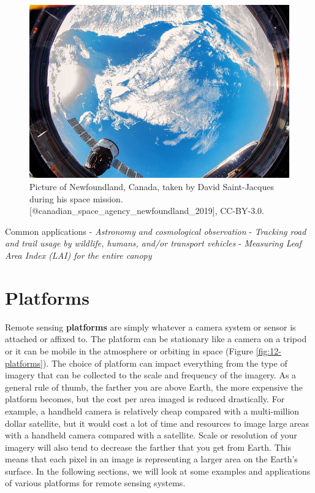 \documentclass[
]{book}
\begin{document}
\begin{figure}
\includegraphics[width=0.9\linewidth]{images/12-newfoundland_from_space} \caption{Picture of Newfoundland, Canada, taken by David Saint-Jacques during his space mission. [@canadian_space_agency_newfoundland_2019], CC-BY-3.0.}\label{fig:12-newfoundland-from-space}
\end{figure}

Common applications
- \emph{Astronomy and cosmological observation}
- \emph{Tracking road and trail usage by wildlife, humans, and/or transport vehicles}
- \emph{Measuring Leaf Area Index (LAI) for the entire canopy}

\section{Platforms}\label{platforms}

Remote sensing \textbf{platforms} are simply whatever a camera system or sensor is attached or affixed to. The platform can be stationary like a camera on a tripod or it can be mobile in the atmosphere or orbiting in space (Figure \ref{fig:12-platforms}). The choice of platform can impact everything from the type of imagery that can be collected to the scale and frequency of the imagery. As a general rule of thumb, the farther you are above Earth, the more expensive the platform becomes, but the cost per area imaged is reduced drastically. For example, a handheld camera is relatively cheap compared with a multi-million dollar satellite, but it would cost a lot of time and resources to image large areas with a handheld camera compared with a satellite. Scale or resolution of your imagery will also tend to decrease the farther that you get from Earth. This means that each pixel in an image is representing a larger area on the Earth's surface. In the following sections, we will look at some examples and applications of various platforms for remote sensing systems.
\end{document}
